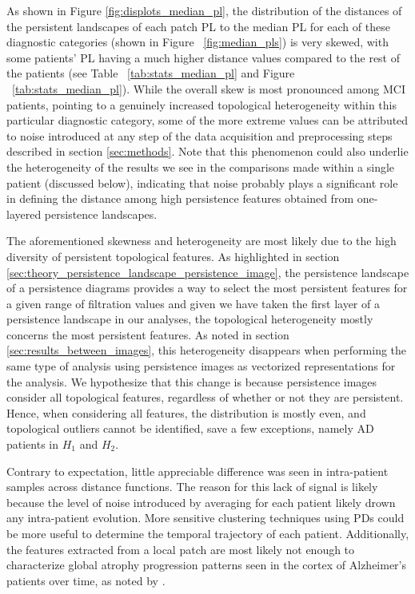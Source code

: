 \documentclass{article}
\begin{document}
As shown in Figure \ref{fig:displots_median_pl}, the distribution of the distances of the persistent
landscapes of each patch PL to the median PL for each of these diagnostic categories (shown in
Figure ~\ref{fig:median_pls}) is very skewed, with some patients' PL having a much higher distance
values compared to the rest of the patients (see Table ~\ref{tab:stats_median_pl} and Figure
~\ref{tab:stats_median_pl}). While the overall skew is most pronounced among MCI patients, pointing
to a genuinely increased topological heterogeneity within this particular diagnostic category, some
of the more extreme values can be attributed to noise introduced at any step of the data acquisition
and preprocessing steps described in section \ref{sec:methods}. Note that this phenomenon could also
underlie the heterogeneity of the results we see in the comparisons made within a single patient
(discussed below), indicating that noise probably plays a significant role in defining the distance
among high persistence features obtained from one-layered persistence landscapes.

The aforementioned skewness and heterogeneity are most likely due to the high diversity of persistent
topological features. As highlighted in section
\ref{sec:theory_persistence_landscape_persistence_image}, the persistence landscape of a persistence
diagrams provides a way to select the most persistent features for a given range of filtration
values and given we have taken the first layer of a persistence landscape in our analyses, the
topological heterogeneity mostly concerns the most persistent features. As noted in section
\ref{sec:results_between_images}, this heterogeneity disappears when performing the same type of
analysis using persistence images as vectorized representations for the analysis. We hypothesize
that this change is because persistence images consider all topological features,
regardless of whether or not they are persistent. Hence, when considering all features, the
distribution is mostly even, and topological outliers cannot be identified, save a few exceptions,
namely AD patients in $H_1$ and $H_2$.

Contrary to expectation, little appreciable difference was seen in intra-patient samples across
distance functions. The reason for this lack of signal is likely because the level of
noise introduced by averaging for each patient likely drown any intra-patient evolution. More
sensitive clustering techniques using PDs could be more useful to determine the temporal trajectory
of each patient. Additionally, the features extracted from a local patch are most likely
not enough to characterize global atrophy progression patterns seen in the cortex of Alzheimer's
patients over time, as noted by \citep{toniolo2018patterns}.
\end{document}

